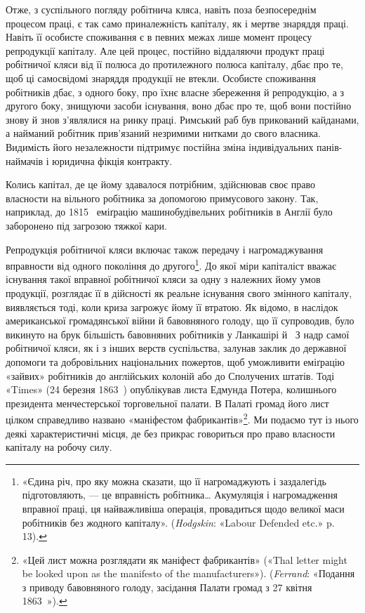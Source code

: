 Отже, з суспільного погляду робітнича кляса, навіть поза
безпосереднім процесом праці, є так само приналежність капіталу,
як і мертве знаряддя праці. Навіть її особисте споживання
є в певних межах лише момент процесу репродукції капіталу.
Але цей процес, постійно віддаляючи продукт праці робітничої
кляси від її полюса до протилежного полюса капіталу, дбає
про те, щоб ці самосвідомі знаряддя продукції не втекли. Особисте
споживання робітників дбає, з одного боку, про їхнє власне збереження
й репродукцію, а з другого боку, знищуючи засоби
існування, воно дбає про те, щоб вони постійно знову й знов
з’являлися на ринку праці. Римський раб був прикований
кайданами, а найманий робітник прив’язаний незримими нитками
до свого власника. Видимість його незалежности підтримує
постійна зміна індивідуальних панів-наймачів і юридична фікція
контракту.

Колись капітал, де це йому здавалося потрібним, здійснював
своє право власности на вільного робітника за допомогою примусового
закону. Так, наприклад, до 1815~ еміґрацію машинобудівельних
робітників в Англії було заборонено під загрозою
тяжкої кари.

Репродукція робітничої кляси включає також передачу і
нагромаджування вправности від одного покоління до другого\footnote{
«Єдина річ, про яку можна сказати, що її нагромаджують і заздалегідь
підготовляють, — це вправність робітника\dots{} Акумуляція і нагромадження
вправної праці, ця найважливіша операція, провадиться щодо
великої маси робітників без жодного капіталу». (\emph{Hodgskin}: «Labour
Defended etc.» p. 13).
}.
До якої міри капіталіст вважає існування такої вправної
робітничої кляси за одну з належних йому умов продукції, розглядає
її в дійсності як реальне існування свого змінного капіталу,
виявляється тоді, коли криза загрожує йому її втратою.
Як відомо, в наслідок американської громадянської війни й
бавовняного голоду, що її супроводив, було викинуто на брук
більшість бавовняних робітників у Ланкашірі й~ З надр
самої робітничої кляси, як і з інших верств суспільства, залунав
заклик до державної допомоги та добровільних національних
пожертов, щоб уможливити еміґрацію «зайвих» робітників до
англійських колоній або до Сполучених штатів. Тоді «Times»
(24 березня 1863~) опублікував листа Едмунда Потера, колишнього
президента менчестерської торговельної палати. В Палаті
громад його лист цілком справедливо названо «маніфестом
фабрикантів»\footnote{
«Цей лист можна розглядати як маніфест фабрикантів» («Thal
letter might be looked upon as the manifesto of the manufacturers»).
(\emph{Ferrand}: «Подання з приводу бавовняного голоду, засідання Палати
громад з 27 квітня 1863~»).
}. Ми подаємо тут із нього деякі характеристичні
місця, де без прикрас говориться про право власности капіталу
на робочу силу.

